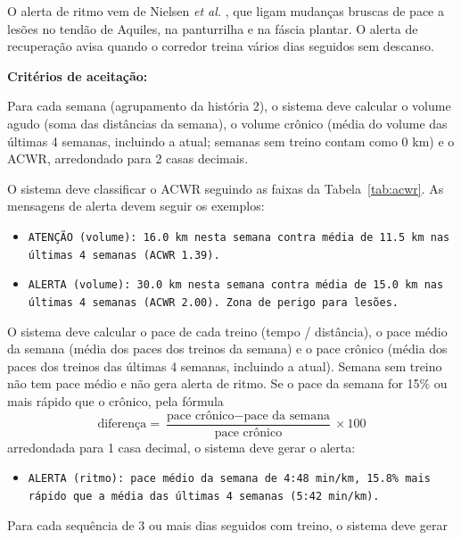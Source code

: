 \documentclass[12pt,a4paper]{article}
\begin{document}
O alerta de ritmo vem de Nielsen \textit{et al.} \cite{nielsen2013}, que ligam mudanças
bruscas de pace a lesões no tendão de Aquiles, na panturrilha e na fáscia plantar. O
alerta de recuperação avisa quando o corredor treina vários dias seguidos sem descanso.

\noindent\textbf{Critérios de aceitação:}
\begin{criterios}[label=\textbf{3.\arabic*:}]
  \item Para cada semana (agrupamento da história 2), o sistema deve calcular o volume
        agudo (soma das distâncias da semana), o volume crônico (média do volume das
        últimas 4 semanas, incluindo a atual; semanas sem treino contam como 0 km) e o
        ACWR, arredondado para 2 casas decimais.
  \item O sistema deve classificar o ACWR seguindo as faixas da
        Tabela~\ref{tab:acwr}. As mensagens de alerta devem seguir os exemplos:
        \begin{itemize}[itemsep=2pt, before=\raggedright\small]
          \item \texttt{ATENÇÃO (volume): 16.0 km nesta semana contra média de 11.5 km nas últimas 4 semanas (ACWR 1.39).}
          \item \texttt{ALERTA (volume): 30.0 km nesta semana contra média de 15.0 km nas últimas 4 semanas (ACWR 2.00). Zona de perigo para lesões.}
        \end{itemize}
  \item O sistema deve calcular o pace de cada treino (tempo / distância), o pace médio
        da semana (média dos paces dos treinos da semana) e o pace crônico (média dos
        paces dos treinos das últimas 4 semanas, incluindo a atual). Semana sem treino
        não tem pace médio e não gera alerta de ritmo. Se o pace da
        semana for 15\% ou mais rápido que o crônico, pela fórmula
        \[
          \text{diferença} = \frac{\text{pace crônico} - \text{pace da semana}}
                                  {\text{pace crônico}} \times 100
        \]
        arredondada para 1 casa decimal, o sistema deve gerar o alerta:
        \begin{itemize}[itemsep=2pt, before=\raggedright\small]
          \item \texttt{ALERTA (ritmo): pace médio da semana de 4:48 min/km, 15.8\% mais rápido que a média das últimas 4 semanas (5:42 min/km).}
        \end{itemize}
  \item Para cada sequência de 3 ou mais dias seguidos com treino, o sistema deve gerar

\end{criterios}
\end{document}
